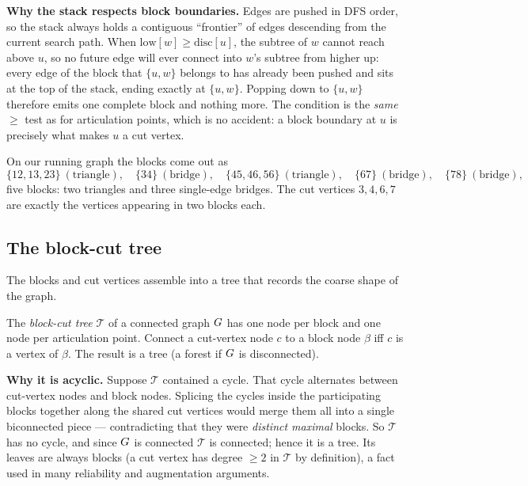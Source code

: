 \begin{whybox}
\textbf{Why the stack respects block boundaries.} Edges are pushed in DFS order, so the
stack always holds a contiguous ``frontier'' of edges descending from the current
search path. When $\mathrm{low}[w]\ge\mathrm{disc}[u]$, the subtree of $w$ cannot reach
above $u$, so no future edge will ever connect into $w$'s subtree from higher up: every
edge of the block that $\{u,w\}$ belongs to has already been pushed and sits at the top
of the stack, ending exactly at $\{u,w\}$. Popping down to $\{u,w\}$ therefore emits one
complete block and nothing more. The condition is the \emph{same} $\ge$ test as for
articulation points, which is no accident: a block boundary at $u$ is precisely what
makes $u$ a cut vertex.
\end{whybox}

On our running graph the blocks come out as
\[
  \{12,13,23\}\ (\text{triangle}),\quad
  \{34\}\ (\text{bridge}),\quad
  \{45,46,56\}\ (\text{triangle}),\quad
  \{67\}\ (\text{bridge}),\quad
  \{78\}\ (\text{bridge}),
\]
five blocks: two triangles and three single-edge bridges. The cut vertices $3,4,6,7$
are exactly the vertices appearing in two blocks each.

\subsection{The block-cut tree}
\label{ch10:bctree}

The blocks and cut vertices assemble into a tree that records the coarse shape of the
graph.

\begin{definition}
\label{ch10:def-bctree}
The \emph{block-cut tree} $\mathcal{T}$ of a connected graph $G$ has one node per
block and one node per articulation point. Connect a cut-vertex node $c$ to a block
node $\beta$ iff $c$ is a vertex of $\beta$. The result is a tree (a forest if $G$
is disconnected).
\end{definition}

\begin{whybox}
\textbf{Why it is acyclic.} Suppose $\mathcal{T}$ contained a cycle. That cycle
alternates between cut-vertex nodes and block nodes. Splicing the cycles inside the
participating blocks together along the shared cut vertices would merge them all into a
single biconnected piece --- contradicting that they were \emph{distinct maximal}
blocks. So $\mathcal{T}$ has no cycle, and since $G$ is connected $\mathcal{T}$ is
connected; hence it is a tree. Its leaves are always blocks (a cut vertex has degree
$\ge2$ in $\mathcal{T}$ by definition), a fact used in many reliability and augmentation
arguments.
\end{whybox}

